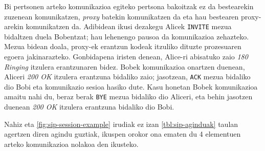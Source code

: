 Bi pertsonen arteko komunikazioa egiteko pertsona bakoitzak ez da bestearekin zuzenean komunikatzen, \textit{proxy} batekin komunikatzen da eta hau bestearen proxy-arekin komunikatzen da. Adibidean ikusi dezakegu Alicek \texttt{INVITE} mezua bidaltzen duela Bobentzat; hau lehenengo pausoa da komunikazioa zehazteko. Mezua bidean doala, proxy-ek erantzun kodeak itzuliko dituzte prozesuaren egoera jakinarazteko. Gonbidapena iristen denean, Alice-ri abisatuko zaio \textit{180 Ringing} itzulera erantzunaren bidez. Bobek komunikazioa onartzen duenean, Aliceri \textit{200 OK} itzulera erantzuna bidaliko zaio; jasotzean, \texttt{ACK} mezua bidaliko dio Bobi eta komunikazio sesioa hasiko dute. Kasu honetan Bobek komunikazioa amaitu nahi du, beraz berak \texttt{BYE} mezua bidaliko dio Aliceri, eta behin jasotzen duenean \textit{200 OK} itzulera erantzuna bidaliko dio Bobi.

Nahiz eta \autoref{fig:sip-session-example} irudiak ez izan \autoref{tbl:sip-aginduak} taulan agertzen diren agindu guztiak, ikuspen orokor ona ematen du 4 elementuen arteko komunikazioa nolakoa den ikusteko.